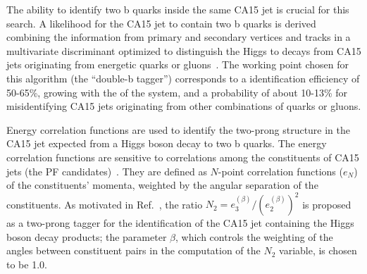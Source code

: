 The ability to identify two b quarks inside the same CA15 jet is crucial for this search. A likelihood for the CA15 jet to contain two b quarks is derived combining the information from primary and secondary vertices and tracks in a multivariate discriminant optimized to distinguish the Higgs to \bb decays from CA15 jets originating from energetic quarks or gluons~\cite{doubleb}.
The working point chosen for this algorithm (the ``double-b tagger'') corresponds to a \bb identification efficiency of 50-65\%, growing with the \pt of the \bb system, and a probability of about 10-13\% for misidentifying CA15 jets originating from other combinations of quarks or gluons.

Energy correlation functions are used to identify the two-prong
structure in the CA15 jet expected from a Higgs boson decay to two b
quarks. The energy correlation functions are sensitive to correlations among the constituents
of CA15 jets (the PF candidates)~\cite{ecf}. They are defined as $N$-point correlation functions ($e_N$) of the constituents' momenta, weighted by the angular separation of the constituents.
%                                                                                                                                                                                                
As motivated in Ref.~\cite{ecf}, the ratio $N_2 =
e_3^{(\beta)}/(e_2^{(\beta)})^2$ is proposed as a two-prong tagger for
the identification of the CA15 jet containing the Higgs boson decay
products; the parameter $\beta$, which controls the weighting of the angles between constituent pairs in the computation of
the $N_2$ variable, is chosen to be 1.0. 

